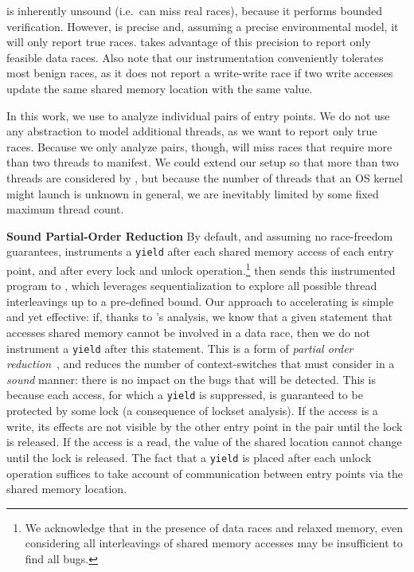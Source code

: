 \corral is inherently unsound (i.e.\ can miss real races), because it performs bounded verification. However, \corral is precise and, assuming a precise environmental model, it will only report true races. \whoop takes advantage of this precision to report only feasible data races. Also note that our instrumentation conveniently tolerates most benign races, as it does not report a write-write race if two write accesses update the same shared memory location with the same value.

In this work, we use \corral to analyze individual pairs of entry points. We do not use any abstraction to model additional threads, as we want \corral to report only true races. Because we only analyze pairs, though, \corral will miss races that require more than two threads to manifest. We could extend our setup so that more than two threads are considered by \corral, but because the number of threads that an OS kernel might launch is unknown in general, we are inevitably limited by some fixed maximum thread count.

\noindent\textbf{Sound Partial-Order Reduction }
%
By default, and assuming no race-freedom guarantees, \whoop instruments a \texttt{yield} after each shared memory access of each entry point, and after every lock and unlock operation.\footnote{We acknowledge that in the presence of data races and relaxed memory, even considering all interleavings of shared memory accesses may be insufficient to find all bugs.} \whoop then sends this instrumented program to \corral, which leverages sequentialization to explore all possible thread interleavings up to a pre-defined bound. Our approach to accelerating \corral is simple and yet effective: if, thanks to \whoop's analysis, we know that a given statement that accesses shared memory cannot be involved in a data race, then we do not instrument a \texttt{yield} after this statement.  This is a form of \emph{partial order reduction}~\cite{DBLP:books/sp/Godefroid96}, and reduces the number of context-switches that \corral must consider in a \emph{sound} manner: there is no impact on the bugs that will be detected.  This is because each access, for which a \texttt{yield} is suppressed, is guaranteed to be protected by some lock (a consequence of lockset analysis).  If the access is a write, its effects are not visible by the other entry point in the pair until the lock is released.  If the access is a read, the value of the shared location cannot change until the lock is released.  The fact that a \texttt{yield} is placed after each unlock operation suffices to take account of communication between entry points via the shared memory location.

